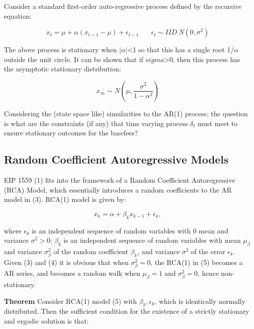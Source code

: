 \documentclass[peerreview]{ieeesyscoin}
\begin{document}
Consider a standard first-order auto-regressive process defined by the recursive equation:

\begin{equation}
x_{t} = \mu + \alpha (x_{t-1} -\mu) + \epsilon_{t-1} ~~~~~~~~ \epsilon_{t} \sim IID~N(0,\sigma^2)
\label{eq:ar1} \tag{3}
\end{equation}

The above process is stationary when $|\alpha|$<1 so that this has a single root 1/$\alpha$ outside the unit circle.  It can be shown that if $sigma$>0, then this process has the asymptotic stationary distribution:

\begin{equation}
x_{\infty} \sim N(\mu,\frac{\sigma^2}{1-\alpha^2})
\label{eq:x_infinity} \tag{4}
\end{equation}

Considering the (state space like) simularities to the AR(1) process; the question is what are the constraints (if any) that time varying process $\delta_{t}$ must meet to ensure stationary outcomes for the basefees?

\subsection{Random Coefficient Autoregressive Models}
\label{section:rca}
EIP 1559 (1) fits into the framework of a Random Coefficient Autoregressive (RCA) Model, which  essentially introduces a random coefficients to the AR model in (3). RCA(1) model is given by:

\begin{equation}
x_{k} = \alpha + \beta_{k}x_{k-1} + \epsilon_{k},
\label{eq:rca1} \tag{5}
\end{equation}

where ${\epsilon_{k}}$ is an independent sequence of random variables with 0 mean and variance $\sigma^2 > 0$; ${\beta_{k}}$ is an independent sequence of random variables with mean $\mu_{\beta}$ and variance $\sigma_{\beta}^2$ of the random coefficient $\beta_{k}$, and variance $\sigma^2$ of the error $\epsilon_{k}$. Given (3) and (4) it is obvious that when $\sigma_{\beta}^2 = 0$, the RCA(1) in (5) becomes a AR series, and becomes a random walk when $\mu_{\beta} = 1$ and $\sigma_{\beta}^2 = 0$, hence non-stationary. 

\textbf{Theorem} Consider RCA(1) model (5) with ${\beta_{k},\epsilon_{k}}$, which is identically normally distributed.  Then the sufficient condition for the existence of a strictly stationary and ergodic solution is that:
\end{document}
